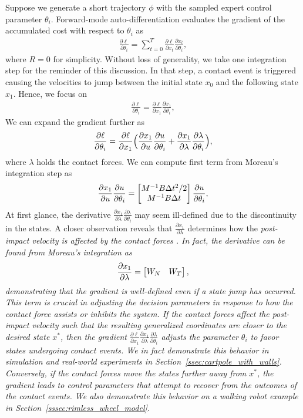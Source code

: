 Suppose we generate a short trajectory $\phi$ with the sampled expert control
parameter $\theta_i$.
%
Forward-mode auto-differentiation evaluates the gradient of the accumulated cost
with respect to $\theta_i$ as 
\begin{align*}
    \frac{\partial \ell}{\partial \theta_i} = \sum_{t=0}^{T} \frac{\partial \ell}{\partial x_t} \frac{\partial x_t}{\partial \theta_i} ,
\end{align*}
\noindent where $R=0$ for simplicity.
%
Without loss of generality, we take one integration step for the reminder of
this discussion. 
%
In that step, a contact event is triggered causing the velocities to jump
between the initial state $x_0$ and the following state $x_1$. 
%
Hence, we focus on 
\begin{align*}
    \frac{\partial \ell}{\partial \theta_i} = \frac{\partial \ell}{\partial x_1} \frac{\partial x_1}{\partial \theta_i},
\end{align*}
%
We can expand the gradient further as 
\begin{align*}
    \frac{\partial \ell}{\partial \theta_i} = \frac{\partial \ell}{\partial x_1} \Bigl( \frac{\partial x_1}{\partial u} \frac{\partial u}{\partial \theta_i} + \frac{\partial x_1}{\partial \lambda}\frac{\partial \lambda}{\partial \theta_i}\Bigr),
\end{align*}
\noindent where $\lambda$ holds the contact forces.
%
We can compute first term from Moreau's integration step as
\begin{align*}
    \frac{\partial x_1}{\partial u} \frac{\partial u}{\partial \theta_i} = 
    \begin{bmatrix}M^{-1}B \Delta t^2/2 \\ M^{-1}B \Delta t\end{bmatrix} \frac{\partial u}{\partial \theta_i},
\end{align*} 
%
At first glance, the derivative $\frac{\partial x_1}{\partial
\lambda}\frac{\partial \lambda}{\partial \theta_i}$ may seem ill-defined due to
the discontinuity in the states. 
%
A closer observation reveals that  $\frac{\partial x_1}{\partial \lambda}$
determines how the \it{post-impact velocity is affected by the
contact forces} \normalfont.
%
In fact, the derivative can be found from Moreau's integration as 
\begin{align*}
    \frac{\partial x_1}{\partial \lambda} = \begin{bmatrix}W_N & W_T \end{bmatrix}, 
\end{align*}
%
demonstrating that the gradient is well-defined even if a state jump has
occurred. 
%
This term is crucial in adjusting the decision parameters in response to how the
contact force assists or inhibits the system.
%
If the contact forces affect the \it{post-impact} \normalfont velocity such that
the resulting generalized coordinates are closer to the desired state $x^*$,
then the gradient $\frac{\partial \ell}{\partial x_1} \frac{\partial
x_1}{\partial \lambda}\frac{\partial \lambda}{\partial \theta_i}$ adjusts the
parameter $\theta_i$ to favor states undergoing contact events. 
%
We in fact demonstrate this behavior in simulation and real-world experiments in
Section~\ref{ssec:cartpole_with_walls}.
%
Conversely, if the contact forces move the states further away from $x^*$, the
gradient leads to control parameters that attempt to recover from the outcomes
of the contact events.
%
We also demonstrate this behavior on a walking robot example in
Section~\ref{sssec:rimless_wheel_model}.